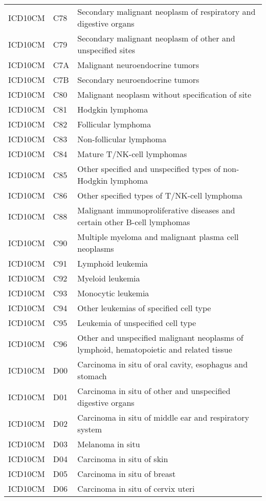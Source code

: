 \begin{longtable}{p{}p{}p{}}
  ICD10CM & C78 & Secondary malignant neoplasm of respiratory and digestive organs \\ 
  ICD10CM & C79 & Secondary malignant neoplasm of other and unspecified sites \\ 
  ICD10CM & C7A & Malignant neuroendocrine tumors \\ 
  ICD10CM & C7B & Secondary neuroendocrine tumors \\ 
  ICD10CM & C80 & Malignant neoplasm without specification of site \\ 
  ICD10CM & C81 & Hodgkin lymphoma \\ 
  ICD10CM & C82 & Follicular lymphoma \\ 
  ICD10CM & C83 & Non-follicular lymphoma \\ 
  ICD10CM & C84 & Mature T/NK-cell lymphomas \\ 
  ICD10CM & C85 & Other specified and unspecified types of non-Hodgkin lymphoma \\ 
  ICD10CM & C86 & Other specified types of T/NK-cell lymphoma \\ 
  ICD10CM & C88 & Malignant immunoproliferative diseases and certain other B-cell lymphomas \\ 
  ICD10CM & C90 & Multiple myeloma and malignant plasma cell neoplasms \\ 
  ICD10CM & C91 & Lymphoid leukemia \\ 
  ICD10CM & C92 & Myeloid leukemia \\ 
  ICD10CM & C93 & Monocytic leukemia \\ 
  ICD10CM & C94 & Other leukemias of specified cell type \\ 
  ICD10CM & C95 & Leukemia of unspecified cell type \\ 
  ICD10CM & C96 & Other and unspecified malignant neoplasms of lymphoid, hematopoietic and related tissue \\ 
  ICD10CM & D00 & Carcinoma in situ of oral cavity, esophagus and stomach \\ 
  ICD10CM & D01 & Carcinoma in situ of other and unspecified digestive organs \\ 
  ICD10CM & D02 & Carcinoma in situ of middle ear and respiratory system \\ 
  ICD10CM & D03 & Melanoma in situ \\ 
  ICD10CM & D04 & Carcinoma in situ of skin \\ 
  ICD10CM & D05 & Carcinoma in situ of breast \\ 
  ICD10CM & D06 & Carcinoma in situ of cervix uteri \\ 

\end{longtable}
